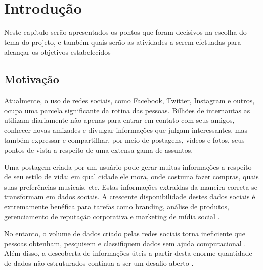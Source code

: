 \documentclass[
	12pt,				%
	openright,			%
	oneside,			%
	a4paper,			%
	english,			%
	spanish,			%
	brazil				%
	]{abntex2}
\begin{document}

 \pretextual

\imprimircapa

\tableofcontents*
\cleardoublepage


\textual

\chapter{Introdução}
	Neste capítulo serão apresentados os pontos que foram decisivos na escolha do tema do projeto, e também quais serão as atividades a serem efetuadas para alcançar os objetivos estabelecidos

	\section{Motivação}
	
	Atualmente, o uso de redes sociais, como Facebook, Twitter, Instagram e outros, ocupa uma parcela significante da rotina das pessoas. Bilhões de internautas as utilizam diariamente não apenas para entrar em contato com seus amigos, conhecer novas amizades e divulgar informações que julgam interessantes, mas também expressar e compartilhar, por meio de postagens, vídeos e fotos, seus pontos de vista a respeito de uma extensa gama de assuntos.
	
	Uma postagem criada por um usuário pode gerar muitas informações a respeito de seu estilo de vida: em qual cidade ele mora, onde costuma fazer compras, quais suas preferências musicais, etc. Estas informações extraídas da maneira correta se transformam em dados sociais. A crescente disponibilidade destes dados sociais é extremamente benéfica para tarefas como branding, análise de produtos, gerenciamento de reputação corporativa e marketing de mídia social \cite{article_sentiment_analysis}. 
	
No entanto, o volume de dados criado pelas redes sociais torna ineficiente que pessoas obtenham, pesquisem e classifiquem dados sem ajuda computacional \cite{conference_fb}. Além disso, a descoberta de informações úteis a partir desta enorme quantidade de dados não estruturados continua a ser um desafio aberto \cite{article_tweet_crisis}.
\end{document}
